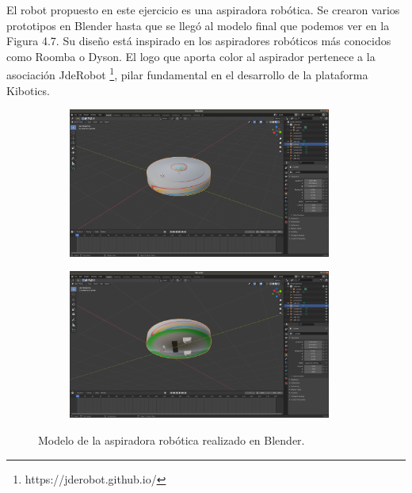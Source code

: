 El robot propuesto en este ejercicio es una aspiradora robótica. Se crearon varios prototipos en Blender hasta que se llegó al modelo final que podemos ver en la Figura 4.7. Su diseño está inspirado en los aspiradores robóticos más conocidos como Roomba o Dyson. El logo que aporta color al aspirador pertenece a la asociación JdeRobot \footnote{https://jderobot.github.io/}, pilar fundamental en el desarrollo de la plataforma Kibotics.
 
 \begin{figure}[H]
  \begin{subfigure}[b]{0.5\textwidth}
  \centering
    \includegraphics[width=0.95\textwidth, height=0.7\textwidth]{chapters/images/roombablender.png}
    \caption{}
    \label{fig:f1}
  \end{subfigure}
  \hfill
  \begin{subfigure}[b]{0.5\textwidth}
  \centering
    \includegraphics[width=0.95\textwidth, height=0.7\textwidth]{chapters/images/roombablender2.png}
	\caption{}    
    \label{fig:f2}
 
  \end{subfigure}
  \caption{Modelo de la aspiradora robótica  realizado en Blender.}
\end{figure}

